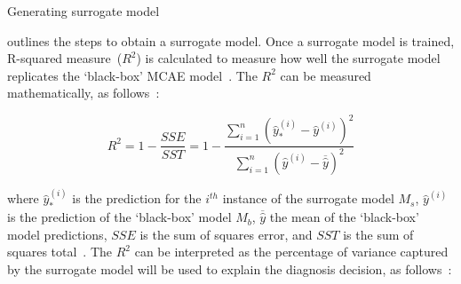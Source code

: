 \begin{algorithm*}[h]
\caption{Generating surrogate model}
\small{
    \DontPrintSemicolon {}%
    \BlankLine%
    \BlankLine%
    }
     \label{algo:surrogate_model_generation}
\end{algorithm*}

\hspace*{3.5mm}  outlines the steps to obtain a surrogate model. Once a surrogate model is trained, R-squared measure~($R^2$) is calculated to measure how well the surrogate model replicates the `black-box' MCAE model~\cite{molnar2019interpretable}. The $R^2$ can be measured mathematically, as follows~\cite{molnar2019interpretable}: 

\begin{equation}
    R^{2}=1-\frac{SSE}{SST}=1-\frac{\sum_{i=1}^{n}\left(\hat{y}_{*}^{(i)}-\hat{y}^{(i)}\right)^{2}}{\sum_{i=1}^{n}\left(\hat{y}^{(i)}-\overline{\hat{y}}\right)^{2}}
    \label{ew:r_squared}
\end{equation}

\hspace*{3.5mm} where $\hat{y}_{*}^{(i)}$ is the prediction for the $i^{th}$ instance of the surrogate model $M_s$, $\hat{y}^{(i)}$ is the prediction of the `black-box' model $M_b$, $\overline{\hat{y}}$ the mean of the `black-box' model predictions, $SSE$ is the sum of squares error, and $SST$ is the sum of squares total~\cite{molnar2019interpretable}. The $R^2$ can be interpreted as the percentage of variance captured by the surrogate model will be used to explain the diagnosis decision, as follows~\cite{molnar2019interpretable}:

